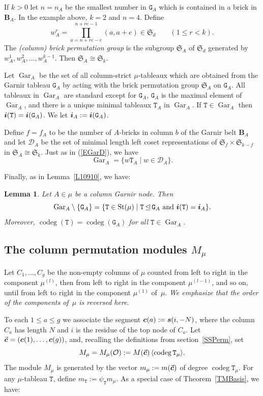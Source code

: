 \documentclass[twoside,11pt,reqno]{amsart}
\numberwithin{equation}{section}
\newtheorem{Lemma}[equation]{Lemma}
\theoremstyle{definition}  %
\let\<\langle
\let\>\rangle
\DeclareMathOperator\ledom{\trianglelefteq}
\def\bi{\text{\boldmath$i$}}
\def\bs{\text{\boldmath$s$}}
\def\bc{\text{\boldmath$c$}}
\newcommand{\St}{\operatorname{St}}
\newcommand{\0}{{\bar 0}}
\newcommand{\1}{{\bar 1}}
\newcommand{\al}{\alpha}
\def\Si{\mathfrak{S}}
\def\Belt{\mathbf{B}}
\newcommand{\D}{{\mathscr D}}
\newcommand\Par[1][]{{\mathscr P}^{\kappa#1}}
\def\T{{\mathtt T}}
\def\G{{\mathtt G}}
\def\codeg{\operatorname{codeg}}
\def\Gar{{\operatorname{Gar}}}
\renewcommand\O{\mathcal O}
\begin{document}
If $k>0$ let $n=n_A$ be the smallest number in $\G_A$ which is contained in a brick in
$\Belt_A$. In the example above, $k=2$ and $n=4$. 
Define
$$w^r_A=\prod_{a=n+re-e}^{n+re-1}(a,a+e)\in\Si_d\qquad (1\le r<k).$$ 
The {\em (column) brick permutation group} is the subgroup $\Si_A$ of $\Si_d$ generated by 
$w^1_A,w^2_A,\dots,w^{k-1}_A$. Then $\Si_A\cong\Si_k$. 

Let $\Gar_A$ be the set of all column-strict $\mu$-tableaux which are obtained from the Garnir tableau
$\G_A$ by acting with the brick permutation group $\Si_A$ on $\G_A$. All tableaux in $\Gar_A$ are standard except for $\G_A$, $\G_A$ is the maximal element of
$\Gar_A$, and there is a unique minimal tableaux $\T_A$ in $\Gar_A$. If $\T\in\Gar_A$ then $\bi(\T)=\bi(\G_A)$. We let $\bi_A:=\bi(\G_A)$. 



Define $f=f_A$ to be the number of $A$-bricks in column $b$ of the Garnir belt $\Belt_A$ 
and let
$\D_A$ be the set of minimal length left coset representations of $\Si_f\times\Si_{k-f}$ in
$\Si_A\cong\Si_k$. Just as in (\ref{EGarD}), we have
\begin{equation}\label{signed EGarD}
\Gar_A=\{w\T_A\mid w\in\D_A\}. 
\end{equation}

Finally, as in Lemma~\ref{L10910}, we have:

\begin{Lemma}\label{signed L10910}
Let 
$A\in\mu$ be a column Garnir node. Then
$$
\Gar_A\setminus\{\G_A\}=\{\T\in\St(\mu)\mid \T\ledom\G_A\ \text{and}\ \bi(\T)=\bi_A\}.
$$
Moreover, $\codeg(\T)=\codeg(\G_A)$ for all $\T\in\Gar_A$. 
\end{Lemma}

\subsection{\boldmath The column permutation modules $M_\mu$}
Let %
$C_1,\dots,C_g$ be the non-empty columns of $\mu$ counted from left to right in the component $\mu^{(l)}$, then from left to right in the component $\mu^{(l-1)}$, and so on, until from left to right in the component $\mu^{(1)}$ of~$\mu$.
{\em We emphasize that the order of the components
of~$\mu$ is reversed here}. 

To each $1\leq a\leq g$ we associate the segment $\bc(a):=\bs(i,-N)$, where the column
$C_a$ has length $N$ and $i$ is the residue of the top node of $C_a$.  Let $\vec{\bc}=(\bc(1),\dots,\bc(g))$,
and, recalling the definitions from section~\ref{SSPerm}, set 
$$
M_\mu=M_\mu(\O):=M(\vec{\bc})\,\<\codeg \T_\mu\>.
$$ 
The module $M_\mu$ is generated by the vector
$
m_\mu:=m(\vec{\bc}) 
$
of degree $\codeg \T_\mu$. For any $\mu$-tableau $\T$, define $m_\T:=\psi_\T m_\mu$. 
As a special case of Theorem~\ref{TMBasis}, we have:
\end{document}
